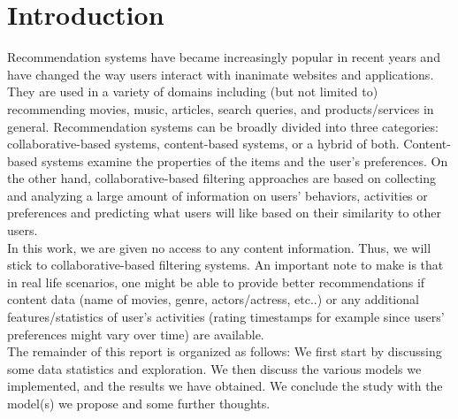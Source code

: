 \documentclass[10pt,conference,compsocconf]{IEEEtran}
\begin{document}
\section{Introduction}
Recommendation systems have became increasingly popular in recent years and have changed the way users interact with inanimate websites and applications. They are used in a variety of domains including (but not limited to) recommending movies, music, articles, search queries, and products/services in general. Recommendation systems can be broadly divided into three categories: collaborative-based systems, content-based systems, or a hybrid of both. Content-based systems examine the properties of the items and the user's preferences. On the other hand, collaborative-based filtering approaches are based on collecting and analyzing a large amount of information on users' behaviors, activities or preferences and predicting what users will like based on their similarity to other users. \\
In this work, we are given no access to any content information. Thus, we will stick to collaborative-based filtering systems. An important note to make is that in real life scenarios, one might be able to provide better recommendations if content data (name of movies, genre, actors/actress, etc..) or any additional features/statistics of user's activities (rating timestamps for example since users' preferences might vary over time) are available. \\
The remainder of this report is organized as follows: We first start by discussing some data statistics and exploration. We then discuss the various models we implemented, and the results we have obtained. We conclude the study with the model(s) we propose and some further thoughts.
\end{document}
